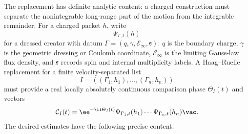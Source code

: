 The replacement has definite analytic content: a charged construction must
separate the nonintegrable long-range part of the motion from the integrable
remainder.  For a charged packet \(h\), write
\[
  \Psi_{\Gamma,t}(h)
\]
for a dressed creator with datum
\(\Gamma=(q,\gamma,\mathcal E_\infty,\mathfrak s)\): \(q\) is the boundary
charge, \(\gamma\) is the geometric dressing or Coulomb coordinate,
\(\mathcal E_\infty\) is the limiting Gauss-law flux density, and
\(\mathfrak s\) records spin and internal multiplicity labels.  A
Haag--Ruelle replacement for a finite velocity-separated list
\[
  I=((\Gamma_1,h_1),\ldots,(\Gamma_n,h_n))
\]
must provide a real locally absolutely continuous comparison phase
\(\Theta_I(t)\) and vectors
\begin{equation}
  \mathcal C_I(t)
  =
  \ee^{-\ii\Theta_I(t)}
  \Psi_{\Gamma_1,t}(h_1)\cdots\Psi_{\Gamma_n,t}(h_n)\vac .
  \label{eq:charged-hr-modified-comparison-vector}
\end{equation}
The desired estimates have the following precise content.

